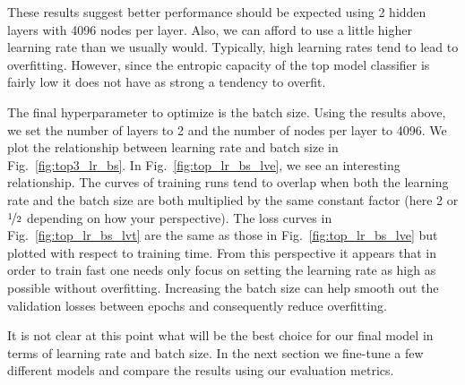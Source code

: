 \documentclass[12pt,journal,compsoc]{IEEEtran}
\begin{document}
These results suggest better performance should be expected using 2 hidden layers with 4096 nodes per layer. Also, we can afford to use a little higher learning rate than we usually would. Typically, high learning rates tend to lead to overfitting. However, since the entropic capacity of the top model classifier is fairly low it does not have as strong a tendency to overfit.

The final hyperparameter to optimize is the batch size. Using the results above, we set the number of layers to 2 and the number of nodes per layer to 4096. We plot the relationship between learning rate and batch size in Fig.~\ref{fig:top3_lr_bs}. In Fig.~\ref{fig:top_lr_bs_lve}, we see an interesting relationship.  The curves of training runs tend to overlap when both the learning rate and the batch size are both multiplied by the same constant factor (here 2 or $\nicefrac{1}{2}$ depending on how your perspective). The loss curves in Fig.~\ref{fig:top_lr_bs_lvt} are the same as those in Fig.~\ref{fig:top_lr_bs_lve} but plotted with respect to training time. From this perspective it appears that in order to train fast one needs only focus on setting the learning rate as high as possible without overfitting. Increasing the batch size can help smooth out the validation losses between epochs and consequently reduce overfitting.


It is not clear at this point what will be the best choice for our final model in terms of learning rate and batch size. In the next section we fine-tune a few different models and compare the results using our evaluation metrics. 



\end{document}

